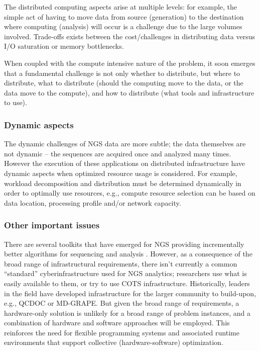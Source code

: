 \documentclass[times]{cpeauth}
\begin{document}
The distributed computing aspects arise at multiple levels: for example, the
simple act of having to move data from source (generation) to the destination
where computing (analysis) will occur is a challenge due to the large volumes
involved. Trade-offs exists between the cost/challenges in distributing data
versus I/O saturation or memory bottlenecks.

When coupled with the compute intensive nature of the problem, it soon emerges
that a fundamental challenge is not only whether to distribute, but where to
distribute, what to distribute (should the computing move to the data, or the
data move to the compute), and how to distribute (what tools and infrastructure
to use).

\subsubsection*{Dynamic aspects}

The dynamic challenges of NGS data are more subtle; the data themselves are not
dynamic -- the sequences are acquired once and analyzed many times. However the
execution of these applications on distributed infrastructure have dynamic
aspects when optimized resource usage is considered. For example, workload
decomposition and distribution must be determined dynamically in order to
optimally use resources, e.g., compute resource selection can be based on data
location, processing profile and/or network capacity.

\subsubsection*{Other important issues}

There are several toolkits that have emerged for NGS providing incrementally
better algorithms for sequencing and analysis \cite{SAMtools, BioJava, BioPerl,
.NETBio}.  However, as a consequence of the broad range of infrastructural
requirements, there isn't currently a common ``standard'' cyberinfrastructure
used for NGS analytics; researchers use what is easily available to them, or try
to use COTS infrastructure. Historically, leaders in the field have developed
infrastructure for the larger community to build-upon, e.g., QCDOC or
MD-GRAPE. But given the broad range of requirements, a hardware-only solution is
unlikely for a broad range of problem instances, and a combination of hardware
and software approaches will be employed. This reinforces the need for flexible
programming systems and associated runtime environments that support collective
(hardware-software) optimization.
\end{document}
